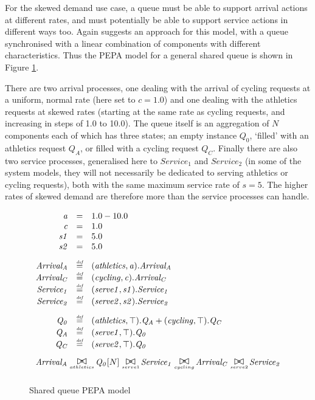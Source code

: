 For the skewed demand use case, a queue must be able to support arrival actions at different rates, and must potentially be able to support service actions in different ways too.  Again \cite{RN75} suggests an approach for this model, with a queue synchronised with a linear combination of components with different characteristics.  Thus the PEPA model for a general shared queue is shown in Figure \ref{figure:pepa_queue_model}.

There are two arrival processes, one dealing with the arrival of cycling requests at a uniform, normal rate (here set to $\mathit{c=1.0}$) and one dealing with the athletics requests at skewed rates (starting at the same rate as cycling requests, and increasing in steps of 1.0 to 10.0).  The queue itself is an aggregation of $\mathit{N}$ components each of which has three states; an empty instance $\mathit{Q_0}$, `filled' with an athletics request $\mathit{Q_A}$, or filled with a cycling request $\mathit{Q_C}$.  Finally there are also two service processes, generalised here to $\mathit{Service_1}$ and $\mathit{Service_2}$ (in some of the system models, they will not necessarily be dedicated to serving athletics or cycling requests), both with the same maximum service rate of $\mathit{s=5}$.  The higher rates of skewed demand are therefore more than the service processes can handle.

\begin{figure}
	\caption{Shared queue PEPA model}
	\label{figure:pepa_queue_model}
	\centering
	\begin{displaymath}
		\begin{array}{rcl}
			\mathit{a} & = & 1.0-10.0\\
			\mathit{c} & = & 1.0\\
			\mathit{s1} & = & 5.0\\
			\mathit{s2} & = & 5.0\\
			[2.0ex]		\mathit{Arrival_A} & \rmdef & (\mathit{athletics},\mathit{a}).\mathit{Arrival_A}\\
			\mathit{Arrival_C} & \rmdef & (\mathit{cycling},\mathit{c}).\mathit{Arrival_C}\\
			\mathit{Service_1} & \rmdef & (\mathit{serve1},\mathit{s1}).\mathit{Service_1}\\
			\mathit{Service_2} & \rmdef & (\mathit{serve2},\mathit{s2}).\mathit{Service_2}\\
			[2.0ex]		\mathit{Q_0} & \rmdef & (\mathit{athletics},\top).\mathit{Q_A}+(\mathit{cycling},\top).\mathit{Q_C}\\
			\mathit{Q_A} & \rmdef & (\mathit{serve1},\top).\mathit{Q_0}\\
			\mathit{Q_C} & \rmdef & (\mathit{serve2},\top).\mathit{Q_0}\\
			[2.0ex]		\multicolumn{3}{l}{\mathit{Arrival_A}\sync{athletics}\mathit{Q_0}[N]\sync{serve1}\mathit{Service_1}\sync{cycling}\mathit{Arrival_C}\sync{serve2}\mathit{Service_2}}\\
			[2.0ex]	\end{array}
	\end{displaymath}
\end{figure}

